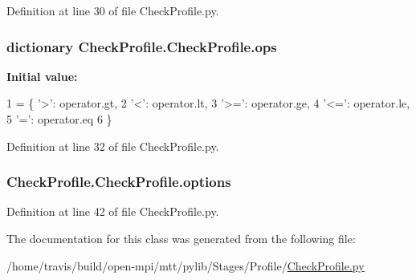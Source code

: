 Definition at line 30 of file Check\-Profile.\-py.

\hypertarget{classCheckProfile_1_1CheckProfile_aa4e92c1c6def969cc4a347111d4ef0de}{
\subsubsection[{ops}]{\setlength{\rightskip}{0pt plus 5cm}dictionary Check\-Profile.\-Check\-Profile.\-ops\hspace{0.3cm}{\ttfamily [static]}}}\label{classCheckProfile_1_1CheckProfile_aa4e92c1c6def969cc4a347111d4ef0de}
{\bfseries Initial value\-:}
\begin{DoxyCode}
1 = \{ \textcolor{stringliteral}{'>'}: operator.gt,
2             \textcolor{stringliteral}{'<'}: operator.lt,
3             \textcolor{stringliteral}{'>='}: operator.ge,
4             \textcolor{stringliteral}{'<='}: operator.le,
5             \textcolor{stringliteral}{'='}: operator.eq
6     \}
\end{DoxyCode}


Definition at line 32 of file Check\-Profile.\-py.

\hypertarget{classCheckProfile_1_1CheckProfile_a60bdbb946d15fb43c2e465bb8a3fff99}{
\subsubsection[{options}]{\setlength{\rightskip}{0pt plus 5cm}Check\-Profile.\-Check\-Profile.\-options}}\label{classCheckProfile_1_1CheckProfile_a60bdbb946d15fb43c2e465bb8a3fff99}


Definition at line 42 of file Check\-Profile.\-py.



The documentation for this class was generated from the following file\-:\begin{DoxyCompactItemize}
\item 
/home/travis/build/open-\/mpi/mtt/pylib/\-Stages/\-Profile/\hyperlink{CheckProfile_8py}{Check\-Profile.\-py}\end{DoxyCompactItemize}

